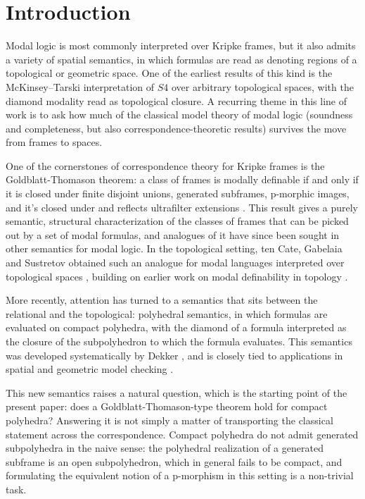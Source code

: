 \section*{Introduction}

Modal logic is most commonly interpreted over Kripke frames, 
but it also admits a variety of spatial semantics, 
in which formulas are read as denoting 
regions of a topological or geometric space.
One of the earliest results of this kind is the McKinsey--Tarski 
interpretation of $S4$ over arbitrary topological spaces, 
with the diamond modality read as topological closure. 
A recurring theme in this line of work is to ask how much 
of the classical model theory of modal logic 
(soundness and completeness, but also correspondence-theoretic results)
survives the move from frames to spaces.

One of the cornerstones of correspondence theory for Kripke frames
is the Goldblatt-Thomason theorem: 
a class of frames is modally definable 
if and only if it is closed under finite disjoint unions, 
generated subframes, p-morphic images, and it's closed under 
and reflects ultrafilter extensions
\cite{Blackburn_Rijke_Venema_2001}. 
This result gives a purely semantic, 
structural characterization of the classes of frames 
that can be picked out by a set of modal formulas, 
and analogues of it have since been sought 
in other semantics for modal logic. 
In the topological setting, ten Cate, Gabelaia and Sustretov 
obtained such an analogue for modal languages 
interpreted over topological spaces \cite{TENCATE}, 
building on earlier work on modal definability in topology 
\cite{Gabelaia2001ModalDI}.

More recently, attention has turned to a semantics 
that sits between the relational and the topological: 
polyhedral semantics, in which formulas are evaluated on 
compact polyhedra, with the diamond of a formula 
interpreted as the closure of the subpolyhedron to which the formula evaluates. 
This semantics was developed systematically by Dekker \cite{Dekker}, 
and is closely tied to applications in spatial 
and geometric model checking \cite{DBLP}. 

This new semantics raises a natural question, 
which is the starting point of the present paper: 
does a Goldblatt-Thomason-type theorem hold for compact polyhedra? 
Answering it is not simply a matter of transporting the classical 
statement across the correspondence. 
Compact polyhedra do not admit generated subpolyhedra 
in the naive sense: the polyhedral realization of a 
generated subframe is an open subpolyhedron, which in general fails to be 
compact, and formulating the equivalent notion of a p-morphism in this setting
is a non-trivial task.

